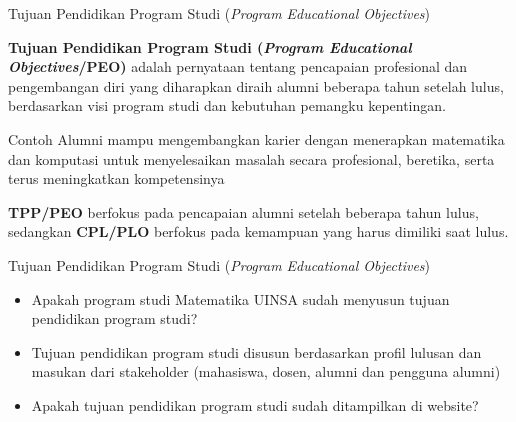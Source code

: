 \documentclass[aspectratio=169,11pt]{beamer}
\begin{document}
\begin{frame}{Tujuan Pendidikan Program Studi (\textit{Program Educational Objectives})}

\textbf{Tujuan Pendidikan Program Studi (\textit{Program Educational Objectives}/PEO)} adalah pernyataan tentang pencapaian profesional dan pengembangan diri yang diharapkan diraih alumni beberapa tahun setelah lulus, berdasarkan visi program studi dan kebutuhan pemangku kepentingan.

\begin{block}{Contoh}
Alumni mampu mengembangkan karier dengan menerapkan matematika dan komputasi untuk menyelesaikan masalah secara profesional, beretika, serta terus meningkatkan kompetensinya
\end{block}

\textbf{TPP/PEO} berfokus pada pencapaian alumni setelah beberapa tahun lulus, sedangkan \textbf{CPL/PLO} berfokus pada kemampuan yang harus dimiliki saat lulus.

\end{frame}

\begin{frame}{Tujuan Pendidikan Program Studi (\textit{Program Educational Objectives})}

\begin{itemize}
\item Apakah program studi Matematika UINSA sudah menyusun tujuan pendidikan program studi?
\item Tujuan pendidikan program studi disusun berdasarkan profil lulusan dan masukan dari stakeholder (mahasiswa, dosen, alumni dan pengguna alumni)
\item Apakah tujuan pendidikan program studi sudah ditampilkan di website?
\end{itemize}

\end{frame}
\end{document}
